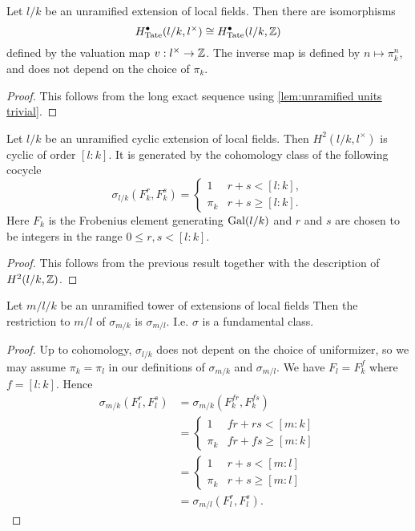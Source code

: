 \begin{corollary}
	Let $l/k$ be an unramified extension of local fields.
	Then there are isomorphisms
	\[
		H^\bullet_{\mathrm{Tate}}(l/k,l^\times) \cong H^\bullet_{\mathrm{Tate}} (l/k,{\mathbb Z})
	\]
	defined by the valuation map $v : l^\times \to {\mathbb Z}$.
	The inverse map is defined by $n \mapsto \pi_k^n$, and does not depend on the choice of $\pi_k$.
\end{corollary}

\begin{proof}
	This follows from the long exact sequence using \ref{lem:unramified units trivial}.
\end{proof}


\begin{lemma} \label{lem:unrammified fundamental class}
	Let $l/k$ be an unramified cyclic extension of local fields.
	Then $H^2(l/k,l^\times)$ is cyclic of order $[l:k]$.
	It is generated by the cohomology class of the following cocycle
	\[
		\sigma_{l/k} (F_k^r, F_k^s) =
		\begin{cases}
			1 & r + s < [l:k], \\
			\pi_k & r + s \ge [l:k].
		\end{cases}
	\]
	Here $F_k$ is the Frobenius element generating $\mathrm{Gal}(l/k)$ and $r$ and $s$
	are chosen to be integers in the range $0 \le r,s <[l:k]$.
\end{lemma}

\begin{proof}
	This follows from the previous result together with
	the description of $H^2(l/k,{\mathbb Z})$.
\end{proof}


\begin{lemma}
	Let $m / l / k$ be an unramified tower of extensions of local fields
	Then the restriction to $m/l$ of $\sigma_{m/k}$ is $\sigma_{m/l}$.
	I.e. $\sigma$ is a fundamental class.
\end{lemma}

\begin{proof}
	Up to cohomology, $\sigma_{l/k}$ does not depent on the choice of
	uniformizer, so we may assume $\pi_k=\pi_l$
	in our definitions of $\sigma_{m/k}$ and $\sigma_{m/l}$.
	We have $F_l = F_k^f$ where $f = [l:k]$.
	Hence
	\begin{align*}
		\sigma_{m/k}(F_l^r, F_l^s)
		&=
		\sigma_{m/k}(F_k^{fr}, F_k^{fs})\\
		&=
		\begin{cases}
			1 & fr + rs < [m:k] \\
			\pi_k & fr + fs \ge [m:k]
		\end{cases}\\
		&=
		\begin{cases}
			1 & r + s < [m:l] \\
			\pi_k & r + s \ge [m:l]
		\end{cases}\\
		&=\sigma_{m/l}(F_l^r,F_l^s).
	\end{align*}
\end{proof}


